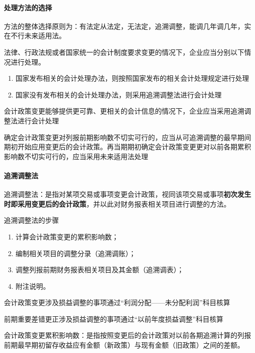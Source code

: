 \documentclass[UTF8,12pt]{ctexart}
\numberwithin{equation}{section} %
\numberwithin{figure}{section}
\numberwithin{table}{section}
\begin{document}
	\paragraph{处理方法的选择}
	方法的整体选择原则为：有法定从法定，无法定，追溯调整，能调几年调几年，实在不行未来适用法。
	
	法律、行政法规或者国家统一的会计制度要求变更的情况下，企业应当分别以下情况进行处理。
	\begin{enumerate}
		\item 国家发布相关的会计处理办法，则按照国家发布的相关会计处理规定进行处理
		
		\item 国家没有发布相关的会计处理办法，则采用追溯调整法进行会计处理
	\end{enumerate}
	
	会计政策变更能够提供更可靠、更相关的会计信息的情况下，企业应当采用追溯调整法进行会计处理
	
	确定会计政策变更对列报前期影响数不切实可行的，应当从可追溯调整的最早期间期初开始应用变更后的会计政策。再当期期初确定会计政策变更更对以前各期累积影响数不切实可行的，应当采用未来适用法处理
	
	\paragraph{追溯调整法}
	追溯调整法：是指对某项交易或事项变更会计政策，视同该项交易或事项\textbf{初次发生时即采用变更后的会计政策}，并以此对财务报表相关项目进行调整的方法。
	
	追溯调整法的步骤
	\begin{enumerate}
		\item 计算会计政策变更的累积影响数；
		
		\item 编制相关项目的调整分录（追溯调账）；
		
		\item 调整列报前期财务报表相关项目及其金额（追溯调表）；
		
		\item 附注说明。
	\end{enumerate}
	
	会计政策变更涉及损益调整的事项通过“利润分配——未分配利润”科目核算
	
	前期重要差错更正涉及损益调整的事项通过“以前年度损益调整”科目核算
	
	
	会计政策变更累积影响数：是指按照变更后的会计政策对以前各期追溯计算的列报前期最早期初留存收益应有金额（新政策）与现有金额（旧政策）之间的差额。
	
\end{document}
